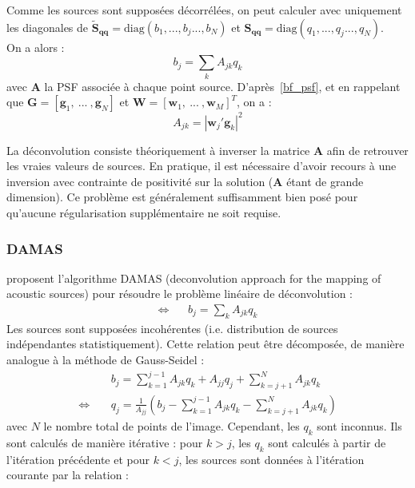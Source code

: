 Comme les sources sont supposées décorrélées, on peut calculer avec uniquement les diagonales de  $\bm{\tilde{S}_{qq}}=\text{diag}(b_1, ... , b_j...,b_N)$ et $\bm{S_{qq}}=\text{diag}(q_1, ... , q_j...,q_N)$.\\

On a alors : 
\begin{equation}
	b_j = \sum_k A_{jk}q_k
\end{equation}
avec  $\bm{A}$ la PSF associée à chaque point source. D'après~\ref{bf_psf}, et en rappelant que $\bm{G}=[\bm{g}_1,~...~,\bm{g}_N]$ et $\bm{W}=[\bm{w}_1,~...~,\bm{w}_M]^T$, on a : 
\begin{equation}
	A_{jk}=|\bm{w}_j'\bm{g}_k|^2
\end{equation}

La déconvolution consiste théoriquement à inverser la matrice $\bm{A}$ afin de retrouver les vraies valeurs de sources. En pratique, il est nécessaire d'avoir recours à une inversion avec contrainte de positivité sur la solution ($\bm{A}$ étant de grande dimension). Ce problème est généralement suffisamment bien posé pour qu'aucune régularisation supplémentaire ne soit requise.



\subsubsection{DAMAS}
 \cite{Brooks2006} proposent l'algorithme DAMAS (deconvolution approach for the mapping of acoustic sources) pour résoudre le problème linéaire de déconvolution : 
\begin{align}
	\Leftrightarrow~~~~ & b_j=\sum_k A_{jk}q_k
\end{align}
Les sources sont supposées incohérentes (i.e. distribution de sources indépendantes statistiquement).
Cette relation peut être décomposée, de manière analogue à la méthode de Gauss-Seidel : 
\begin{align}
	&b_j= \sum_{k=1}^{j-1}A_{jk}q_k + A_{jj}q_j + \sum_{k=j+1}^{N}A_{jk}q_k\\
	\Leftrightarrow~~~~~& q_j = \frac{1}{A_{jj}}\left( b_j - \sum_{k=1}^{j-1}A_{jk}q_k -  \sum_{k=j+1}^{N}A_{jk}q_k   \right)
\end{align}
avec $N$ le nombre total de points de l'image.
Cependant, les $q_k$ sont inconnus. Ils sont calculés de manière itérative : pour $k>j$, les $q_k$ sont calculés à partir de l'itération précédente et pour $k<j$, les sources sont données à l'itération courante par la relation : 


